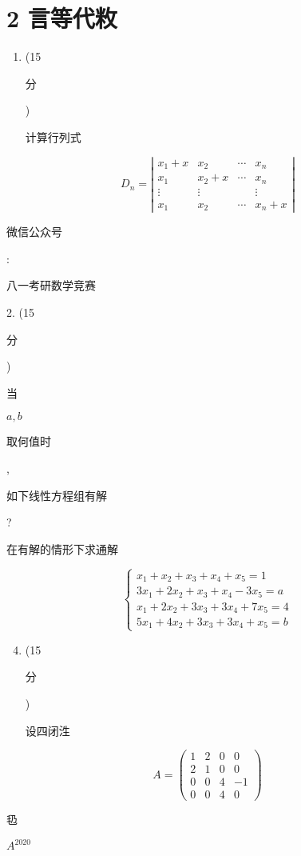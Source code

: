 \documentclass[10pt]{article}
\begin{document}
\section{2 言等代敉}
\begin{enumerate}
  \item (15 \begin{CJK}{UTF8}{mj}分\end{CJK}) \begin{CJK}{UTF8}{mj}计算行列式\end{CJK}
\end{enumerate}
$$
D_{n}=\left|\begin{array}{cccc}
x_{1}+x & x_{2} & \cdots & x_{n} \\
x_{1} & x_{2}+x & \cdots & x_{n} \\
\vdots & \vdots & & \vdots \\
x_{1} & x_{2} & \cdots & x_{n}+x
\end{array}\right|
$$
\begin{CJK}{UTF8}{mj}微信公众号\end{CJK}: \begin{CJK}{UTF8}{mj}八一考研数学竞赛\end{CJK} 2. (15 \begin{CJK}{UTF8}{mj}分\end{CJK}) \begin{CJK}{UTF8}{mj}当\end{CJK} $a, b$ \begin{CJK}{UTF8}{mj}取何值时\end{CJK}, \begin{CJK}{UTF8}{mj}如下线性方程组有解\end{CJK}? \begin{CJK}{UTF8}{mj}在有解的情形下求通解\end{CJK}
$$
\left\{\begin{array}{l}
x_{1}+x_{2}+x_{3}+x_{4}+x_{5}=1 \\
3 x_{1}+2 x_{2}+x_{3}+x_{4}-3 x_{5}=a \\
x_{1}+2 x_{2}+3 x_{3}+3 x_{4}+7 x_{5}=4 \\
5 x_{1}+4 x_{2}+3 x_{3}+3 x_{4}+x_{5}=b
\end{array}\right.
$$

\begin{enumerate}
  \setcounter{enumi}{3}
  \item (15 \begin{CJK}{UTF8}{mj}分\end{CJK}) \begin{CJK}{UTF8}{mj}设四闭泩\end{CJK}
\end{enumerate}
$$
A=\left(\begin{array}{cccc}
1 & 2 & 0 & 0 \\
2 & 1 & 0 & 0 \\
0 & 0 & 4 & -1 \\
0 & 0 & 4 & 0
\end{array}\right)
$$
\begin{CJK}{UTF8}{mj}㲌\end{CJK} $A^{2020}$
\end{document}
